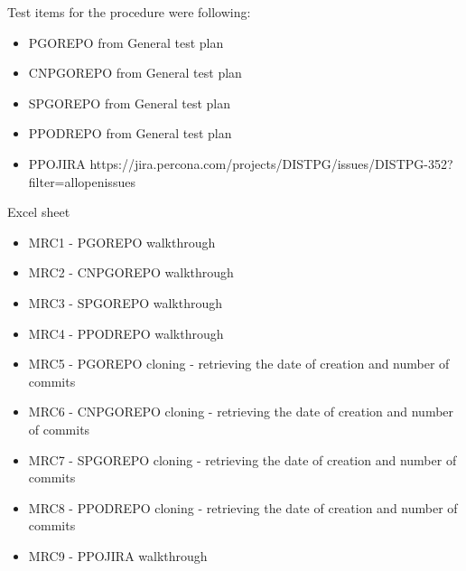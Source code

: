 
Test items for the procedure were following:
\begin{itemize}
    \item PGOREPO from General test plan
    \item CNPGOREPO from General test plan
    \item SPGOREPO from General test plan
    \item PPODREPO from General test plan
    \item PPOJIRA https://jira.percona.com/projects/DISTPG/issues/DISTPG-352?filter=allopenissues
\end{itemize}

Excel sheet

\begin{itemize}
    \item MRC1 - PGOREPO walkthrough
    \item MRC2 - CNPGOREPO walkthrough
    \item MRC3 - SPGOREPO walkthrough
    \item MRC4 - PPODREPO walkthrough
    \item MRC5 - PGOREPO cloning - retrieving the date of creation and number of commits
    \item MRC6 - CNPGOREPO cloning - retrieving the date of creation and number of commits
    \item MRC7 - SPGOREPO cloning - retrieving the date of creation and number of commits
    \item MRC8 - PPODREPO cloning - retrieving the date of creation and number of commits
    \item MRC9 - PPOJIRA walkthrough
\end{itemize}

